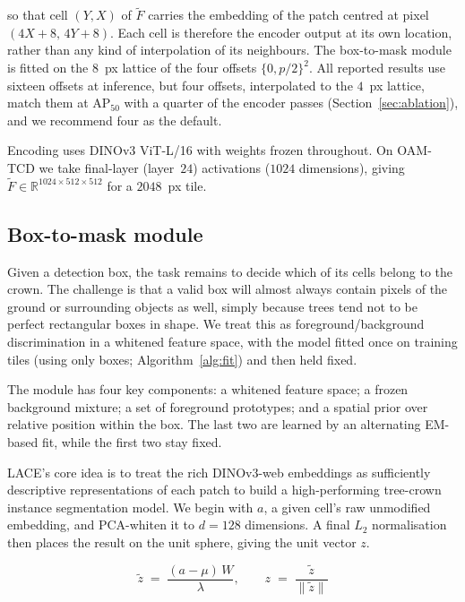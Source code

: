 \documentclass[remotesensing,article,submit,moreauthors]{Definitions/mdpi}
\begin{document}
so that cell $(Y, X)$ of $\widetilde F$ carries the embedding of the patch centred at pixel $(4X + 8,\, 4Y + 8)$. Each cell is therefore the encoder output at its own location, rather than any kind of interpolation of its neighbours. The box-to-mask module is fitted on the $8$~px lattice of the four offsets $\{0, p/2\}^2$. All reported results use sixteen offsets at inference, but four offsets, interpolated to the $4$~px lattice, match them at AP$_{50}$ with a quarter of the encoder passes (Section~\ref{sec:ablation}), and we recommend four as the default.

Encoding uses DINOv3 ViT-L/16 with weights frozen throughout. On OAM-TCD we take final-layer (layer~$24$) activations ($1024$ dimensions), giving $\widetilde F \in \mathbb{R}^{1024 \times 512 \times 512}$ for a $2048$~px tile.


\subsection{Box-to-mask module}
\label{sec:masker}

Given a detection box, the task remains to decide which of its cells belong to the crown. The challenge is that a valid box will almost always contain pixels of the ground or surrounding objects as well, simply because trees tend not to be perfect rectangular boxes in shape. We treat this as foreground/background discrimination in a whitened feature space, with the model fitted once on training tiles (using only boxes; Algorithm~\ref{alg:fit}) and then held fixed.

The module has four key components: a whitened feature space; a frozen background mixture; a set of foreground prototypes; and a spatial prior over relative position within the box. The last two are learned by an alternating EM-based fit, while the first two stay fixed.

LACE's core idea is to treat the rich DINOv3-web embeddings as sufficiently descriptive representations of each patch to build a high-performing tree-crown instance segmentation model. We begin with $a$, a given cell's raw unmodified embedding, and PCA-whiten it to $d = 128$ dimensions. A final $L_2$ normalisation then places the result on the unit sphere, giving the unit vector $z$.

\begin{equation}
\tilde z \;=\; \frac{(a - \mu)\,W}{\lambda}, \qquad z \;=\; \frac{\tilde z}{\lVert \tilde z \rVert}
\label{eq:whiten}
\end{equation}
\end{document}
